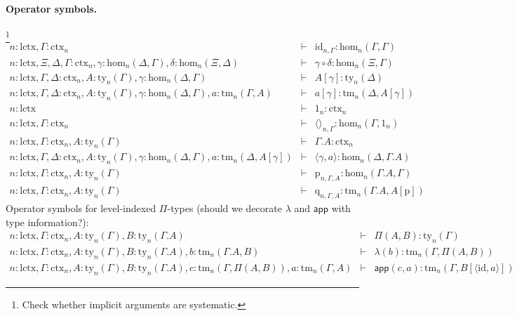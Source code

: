 \documentclass[11pt,a4paper]{article}
\theoremstyle{plain}
\theoremstyle{definition}
\newcommand{\id}{\mathsf{id}}
\newcommand{\app}[2]{{#1\,#2}} %
\def\sub{\mathrm{hom}}
\def\id{\mathrm{id}}
\def\lctx{\mathrm{lctx}}
\newcommand{\ctx}{\mathrm{ctx}}
\newcommand{\ty}{\mathrm{ty}}
\newcommand{\tm}{\mathrm{tm}}
\newcommand{\tuple}[1]{\langle #1 \rangle}
\newcommand{\cext}{.}
\def\p{\mathrm{p}}
\def\q{\mathrm{q}}
\def\app{\mathsf{app}}
\begin{document}
\paragraph{Operator symbols.} \footnote{Check whether implicit arguments are systematic.}
\begin{eqnarray*}
n : \lctx, \Gamma : \ctx_n &\vdash& \id_{n,\Gamma} : \sub_n(\Gamma,\Gamma)\\
n : \lctx, \Xi,\Delta,\Gamma : \ctx_n, \gamma : \sub_n(\Delta,\Gamma), \delta : \sub_n(\Xi,\Delta) &\vdash&
\gamma \circ \delta : \sub_n(\Xi,\Gamma)\\
n : \lctx, \Gamma,\Delta : \ctx_n, A:\ty_n(\Gamma), \gamma : \sub_n(\Delta,\Gamma) &\vdash&
A[\gamma] : \ty_n(\Delta)\\
n : \lctx, \Gamma,\Delta : \ctx_n, A:\ty_n(\Gamma), \gamma : \sub_n(\Delta,\Gamma), a:\tm_n(\Gamma,A) &\vdash&  a[\gamma] : \tm_n(\Delta,A[\gamma])\\
n : \lctx &\vdash& 1_n : \ctx_n\\
n : \lctx, \Gamma : \ctx_n &\vdash& \tuple{}_{n,\Gamma} : \sub_n(\Gamma,1_n)\\
n : \lctx, \Gamma : \ctx_n, A:\ty_n (\Gamma) &\vdash& \Gamma \cext A : \ctx_n \\
n : \lctx, \Gamma,\Delta : \ctx_n , A:\ty_n (\Gamma), \gamma : \sub_n (\Delta,\Gamma), a:\tm_n (\Delta,A[\gamma]) &\vdash& \tuple{\gamma,a} : \sub_n (\Delta,\Gamma\cext A)\\
n : \lctx, \Gamma : \ctx_n , A:\ty_n (\Gamma) &\vdash& \p_{n,\Gamma,A}: \sub_n (\Gamma\cext A,\Gamma)\\
n : \lctx, \Gamma : \ctx_n , A:\ty_n (\Gamma) &\vdash& \q_{n,\Gamma,A}: \tm_n (\Gamma\cext A,A[\p])
\end{eqnarray*}
Operator symbols for level-indexed $\Pi$-types (should we decorate $\lambda$ and $\app$ with type information?):
\begin{eqnarray*}
n : \lctx, \Gamma : \ctx_n, A : \ty_n(\Gamma), B : \ty_n(\Gamma.A)&\vdash& \Pi(A,B) : \ty_n(\Gamma)\\
n : \lctx, \Gamma : \ctx_n, A : \ty_n(\Gamma), B : \ty_n(\Gamma.A), b : \tm_n(\Gamma.A, B) &\vdash& \lambda(b) : \tm_n(\Gamma,\Pi(A,B))\\
n : \lctx, \Gamma : \ctx_n, A : \ty_n(\Gamma), B : \ty_n(\Gamma.A), c :  \tm_n(\Gamma,\Pi(A,B)), a : \tm_n(\Gamma, A) &\vdash& \app(c,a) : \tm_n(\Gamma, B[\tuple{\id,a}])
\end{eqnarray*}
\end{document}
